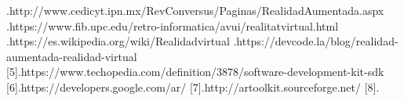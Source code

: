 
\noindent
[1].http://www.cedicyt.ipn.mx/RevConversus/Paginas/RealidadAumentada.aspx
\newline
[2].https://www.fib.upc.edu/retro-informatica/avui/realitatvirtual.html \newline
[3].https://es.wikipedia.org/wiki/Realidadvirtual
\newline
[4].https://devcode.la/blog/realidad-aumentada-realidad-virtual
[5].https://www.techopedia.com/definition/3878/software-development-kit-sdk
[6].https://developers.google.com/ar/
[7].http://artoolkit.sourceforge.net/
[8].

